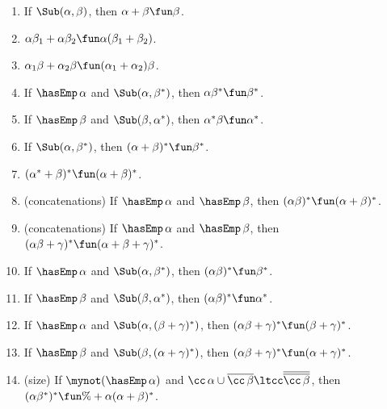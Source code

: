 \begin{enumerate}[\quad(1)]
\item If $\Sub(\alpha,\beta)$, then $\alpha + \beta \fun \beta$.

\item $\alpha\beta_1 + \alpha\beta_2 \fun \alpha(\beta_1+\beta_2)$.

\item $\alpha_1\beta + \alpha_2\beta \fun (\alpha_1+\alpha_2)\beta$.

\item If $\hasEmp\,\alpha$ and $\Sub(\alpha,\beta^*)$, then
  $\alpha\beta^* \fun \beta^*$.

\item If $\hasEmp\,\beta$ and $\Sub(\beta,\alpha^*)$, then
  $\alpha^*\beta \fun \alpha^*$.

\item If $\Sub(\alpha,\beta^*)$, then $(\alpha+\beta)^* \fun \beta^*$.

\item $(\alpha^* + \beta)^* \fun (\alpha+\beta)^*$.

\item (concatenations) If $\hasEmp\,\alpha$ and $\hasEmp\,\beta$, then
  $(\alpha\beta)^* \fun (\alpha+\beta)^*$.

\item (concatenations) If $\hasEmp\,\alpha$ and $\hasEmp\,\beta$, then
  $(\alpha\beta + \gamma)^* \fun (\alpha+\beta+\gamma)^*$.
 
\item If $\hasEmp\,\alpha$ and $\Sub(\alpha,\beta^*)$, then
  $(\alpha\beta)^* \fun \beta^*$.

\item If $\hasEmp\,\beta$ and $\Sub(\beta,\alpha^*)$, then
  $(\alpha\beta)^* \fun \alpha^*$.

\item If $\hasEmp\,\alpha$ and $\Sub(\alpha,(\beta + \gamma)^*)$, then
  $(\alpha\beta + \gamma)^* \fun (\beta + \gamma)^*$.

\item If $\hasEmp\,\beta$ and $\Sub(\beta,(\alpha + \gamma)^*)$, then
  $(\alpha\beta + \gamma)^* \fun (\alpha + \gamma)^*$.

\item (size) If $\mynot(\hasEmp\,\alpha)$ and $\cc\,\alpha \cup
  \overline{\cc\,\beta} \ltcc \overline{\overline{\cc\,\beta}}$, then
  $(\alpha\beta^*)^* \fun \% + \alpha(\alpha+\beta)^*$.


\end{enumerate}
